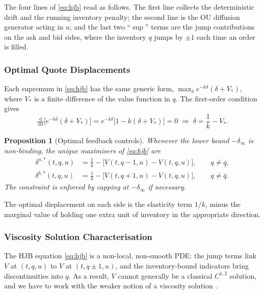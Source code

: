 \documentclass[11pt,a4paper]{article}
\theoremstyle{plain}
\newtheorem{proposition}[theorem]{Proposition}
\theoremstyle{definition}
\newcommand{\dd}{\,\mathrm{d}}
\begin{document}
The four lines of \eqref{eq:hjb} read as follows. The first line collects
the deterministic drift and the running inventory penalty; the second line
is the OU diffusion generator acting in $u$; and the last two ``$\sup$''
terms are the jump contributions on the ask and bid sides, where the
inventory $q$ jumps by $\pm 1$ each time an order is filled.

\subsubsection{Optimal Quote Displacements}

Each supremum in \eqref{eq:hjb} has the same generic form,
$\max_{\delta} e^{-k\delta}(\delta + V_*)$, where $V_*$ is a finite
difference of the value function in $q$. The first-order condition gives
\[
  \tfrac{\dd}{\dd \delta}\bigl[e^{-k\delta}(\delta + V_*)\bigr]
  = e^{-k\delta}\bigl[1 - k(\delta + V_*)\bigr] = 0
  \;\Longrightarrow\; \delta = \frac{1}{k} - V_*.
\]

\begin{proposition}[Optimal feedback controls]
\label{prop:optimal-controls}
Whenever the lower bound $-\delta_\infty$ is non-binding, the unique
maximisers of \eqref{eq:hjb} are
\begin{align}
  \delta^{a,*}(t,q,u) &= \frac{1}{k} - \bigl[V(t,q-1,u) - V(t,q,u)\bigr],
        \qquad q\ne\underline{q},
        \label{eq:optimal-a}\\
  \delta^{b,*}(t,q,u) &= \frac{1}{k} - \bigl[V(t,q+1,u) - V(t,q,u)\bigr],
        \qquad q\ne\bar{q}.
        \label{eq:optimal-b}
\end{align}
The constraint is enforced by capping at $-\delta_\infty$ if necessary.
\end{proposition}

The optimal displacement on each side is the elasticity
term $1/k$, minus the marginal value of holding one extra unit of
inventory in the appropriate direction.

\subsubsection{Viscosity Solution Characterisation}

The HJB equation \eqref{eq:hjb} is a non-local, non-smooth PDE: the jump
terms link $V$ at $(t,q,u)$ to $V$ at $(t,q\pm 1,u)$, and the
inventory-bound indicators bring discontinuities into $q$. As a result,
$V$ cannot generally be a classical $C^{1,2}$ solution, and we have to
work with the weaker notion of a viscosity solution
\cite[Ch.\ 5]{touzi2012optimal}.
\end{document}
